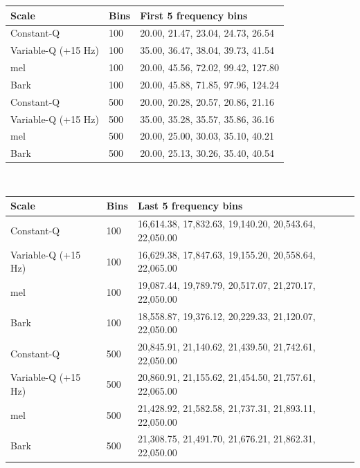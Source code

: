 \documentclass[report.tex]{subfiles}
\begin{document}
\begin{table}[ht]
	\centering
\begin{tabular}{ |l|l|p{9cm}| }
	 \hline
	 Scale & Bins & First 5 frequency bins \\
	 \hline
	 \hline
	 Constant-Q & 100 & 20.00, 21.47, 23.04, 24.73, 26.54 \\
	 \hline
	 Variable-Q (+15 Hz) & 100 & 35.00, 36.47, 38.04, 39.73, 41.54 \\
	 \hline
	 mel & 100 & 20.00, 45.56, 72.02, 99.42, 127.80 \\
	 \hline
	 Bark & 100 & 20.00, 45.88, 71.85, 97.96, 124.24 \\
	 \hline
	 Constant-Q & 500 & 20.00, 20.28, 20.57, 20.86, 21.16 \\
	 \hline
	 Variable-Q (+15 Hz) & 500 & 35.00, 35.28, 35.57, 35.86, 36.16 \\
	 \hline
	 mel & 500 & 20.00, 25.00, 30.03, 35.10, 40.21 \\
	 \hline
	 Bark & 500 & 20.00, 25.13, 30.26, 35.40, 40.54 \\
	 \hline
\end{tabular}\\
\vspace{1em}
\begin{tabular}{ |l|l|p{9cm}| }
	 \hline
	 Scale & Bins & Last 5 frequency bins \\
	 \hline
	 \hline
	 Constant-Q & 100 & 16,614.38, 17,832.63, 19,140.20, 20,543.64, 22,050.00 \\
	 \hline
	 Variable-Q (+15 Hz) & 100 & 16,629.38, 17,847.63, 19,155.20, 20,558.64, 22,065.00 \\
	 \hline
	 mel & 100 & 19,087.44, 19,789.79, 20,517.07, 21,270.17, 22,050.00 \\
	 \hline
	 Bark & 100 & 18,558.87, 19,376.12, 20,229.33, 21,120.07, 22,050.00 \\
	 \hline
	 Constant-Q & 500 & 20,845.91, 21,140.62, 21,439.50, 21,742.61, 22,050.00 \\
	 \hline
	 Variable-Q (+15 Hz) & 500 & 20,860.91, 21,155.62, 21,454.50, 21,757.61, 22,065.00 \\
	 \hline
	 mel & 500 & 21,428.92, 21,582.58, 21,737.31, 21,893.11, 22,050.00 \\
	 \hline
	 Bark & 500 & 21,308.75, 21,491.70, 21,676.21, 21,862.31, 22,050.00 \\
	 \hline
\end{tabular}\\
\vspace{1em}
\begin{tabular}{ |l|l|p{9cm}| }

\end{tabular}
\end{table}
\end{document}
